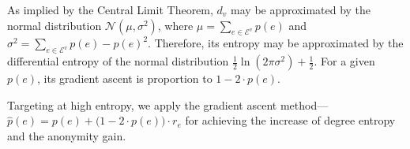 \begin{lemma}
As implied by the Central Limit Theorem, $d_{v}$ may be approximated by the normal distribution $\mathcal{N}(\mu,\sigma^2)$, where $\mu=\sum_{e \in \mathcal{E}^{v}} p(e)$ and $\sigma^2=\sum_{e \in \mathcal{E}^{v}} p(e)-p(e)^2$. Therefore, its entropy may be approximated by the differential entropy of the normal distribution $\frac{1}{2} \ln(2\pi\sigma^2) + \frac{1}{2}$. For a given $p(e)$, its gradient ascent is proportion to $1-2\cdot p(e)$. 
\end{lemma}
Targeting at high entropy, we apply the gradient ascent method---$\hat{p}(e)=p(e)+ \big( 1-2\cdot p(e) \big) \cdot r_{e} $ for achieving the increase of degree entropy and the anonymity gain.
